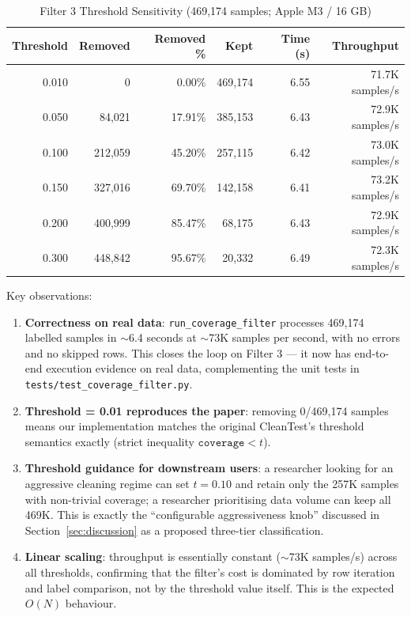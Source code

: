 \documentclass[acmlarge,nonacm,screen]{acmart}
\begin{document}
\begin{table}[htbp]
\caption{Filter 3 Threshold Sensitivity (469,174 samples; Apple M3 / 16 GB)}
\label{tab:filter3-sweep}
\begin{tabular}{@{}rrrrrr@{}}
\toprule
\textbf{Threshold} & \textbf{Removed} & \textbf{Removed \%} & \textbf{Kept} & \textbf{Time (s)} & \textbf{Throughput} \\
\midrule
0.010 & 0       & 0.00\%  & 469,174 & 6.55 & 71.7K samples/s \\
0.050 & 84,021  & 17.91\% & 385,153 & 6.43 & 72.9K samples/s \\
0.100 & 212,059 & 45.20\% & 257,115 & 6.42 & 73.0K samples/s \\
0.150 & 327,016 & 69.70\% & 142,158 & 6.41 & 73.2K samples/s \\
0.200 & 400,999 & 85.47\% & 68,175  & 6.43 & 72.9K samples/s \\
0.300 & 448,842 & 95.67\% & 20,332  & 6.49 & 72.3K samples/s \\
\bottomrule
\end{tabular}
\end{table}

Key observations:

\begin{enumerate}
    \item \textbf{Correctness on real data}: \texttt{run\_coverage\_filter}
    processes 469{,}174 labelled samples in $\sim$6.4 seconds at
    $\sim$73K samples per second, with no errors and no skipped rows. This
    closes the loop on Filter 3 --- it now has end-to-end execution evidence
    on real data, complementing the unit tests in
    \texttt{tests/test\_coverage\_filter.py}.

    \item \textbf{Threshold = 0.01 reproduces the paper}: removing 0/469{,}174
    samples means our implementation matches the original CleanTest's
    threshold semantics exactly (strict inequality $\texttt{coverage} < t$).

    \item \textbf{Threshold guidance for downstream users}: a researcher
    looking for an aggressive cleaning regime can set $t = 0.10$ and retain
    only the 257K samples with non-trivial coverage; a researcher prioritising
    data volume can keep all 469K. This is exactly the ``configurable
    aggressiveness knob'' discussed in Section~\ref{sec:discussion} as a
    proposed three-tier classification.

    \item \textbf{Linear scaling}: throughput is essentially constant
    ($\sim$73K samples/s) across all thresholds, confirming that the
    filter's cost is dominated by row iteration and label comparison, not
    by the threshold value itself. This is the expected $O(N)$ behaviour.
\end{enumerate}
\end{document}
